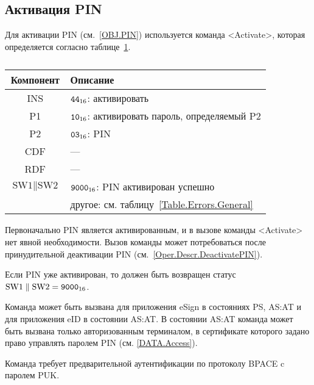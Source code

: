 %


\subsection{Активация PIN}\label{Oper.Descr.ActivatePIN}

Для активации PIN (см.~\ref{OBJ.PIN})  используется
команда <Activate>, которая определяется согласно 
таблице~\ref{Table.Oper.ActivatePINCmd}.

\begin{table}[hbt]
\caption{}\label{Table.Oper.ActivatePINCmd}
\begin{tabular}{|c|p{14cm}|}
\hline
Компонент & Описание\\
\hline
\hline
INS & $\texttt{44}_{16}$: активировать\\
\hline
P1 & $\texttt{10}_{16}$: активировать пароль, определяемый P2\\
\hline
P2 & $\texttt{03}_{16}$: PIN \\
\hline
CDF &  ---  \\
\hline 
RDF &  --- \\
\hline
$\text{SW1} \parallel \text{SW2}$ & 
  $\texttt{9000}_{16}$:  PIN активирован успешно\\
  & другое: см. таблицу~\ref{Table.Errors.General}\\
\hline
\end{tabular}
\end{table}

Первоначально PIN является активированным, и в вызове команды <Activate> 
нет явной необходимости. Вызов команды может потребоваться после 
принудительной деактивации PIN (см.~\ref{Oper.Descr.DeactivatePIN}). 

Если PIN уже активирован, то должен быть возвращен 
статус $\text{SW1} \parallel \text{SW2} = \texttt{9000}_{16}$.

Команда может быть вызвана для приложения eSign 
в состояниях PS, AS:AT и для приложения eID в состоянии AS:AT. 
В состоянии AS:AT команда может быть вызвана 
только авторизованным терминалом, в сертификате которого задано право
управлять паролем PIN (см. \ref{DATA.Access}).

Команда требует предварительной аутентификации по 
протоколу BPACE c паролем PUK.


